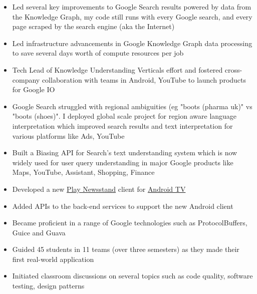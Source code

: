\documentclass[11pt,a4paper]{moderncv}
\begin{document}
{\begin{itemize}
        \item Led several key improvements to Google Search results powered by data from the Knowledge Graph, my code still runs with every Google search, and every page scraped by the search engine (aka the Internet)
        \item Led infrastructure advancements in Google Knowledge Graph data processing to save several days worth of compute resources per job
        \item Tech Lead of Knowledge Understanding Verticals effort and fostered cross-company collaboration with teams in Android, YouTube to launch products for Google IO
        \item Google Search struggled with regional ambiguities (eg "boots (pharma uk)" vs "boots (shoes)". I deployed global scale project for region aware language interpretation which improved search results and text interpretation for various platforms like Ads, YouTube
        \item Built a Biasing API for Search's text understanding system which is now widely used for user query understanding in major Google products like Maps, YouTube, Assistant, Shopping, Finance
 \end{itemize}}
{\begin{itemize}
        \item Developed a new \href{https://play.google.com/store/apps/details?id=com.google.android.apps.magazines&hl=en}{Play Newsstand} client for \href{http://www.android.com/tv/}{Android TV}
        \item Added APIs to the back-end services to support the new Android client
        \item Became proficient in a range of Google technologies such as ProtocolBuffers, Guice and Guava
 \end{itemize}}
{\begin{itemize}
        \item Guided 45 students in 11 teams (over three semesters) as they made their first real-world application
        \item Initiated classroom discussions on several topics such as code quality, software testing, design patterns
 \end{itemize}}
\end{document}
